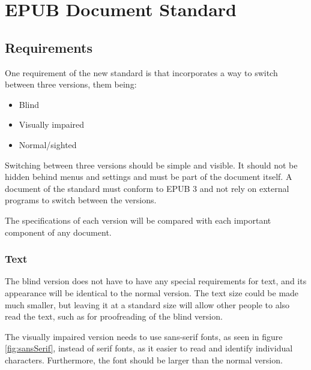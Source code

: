 \chapter{EPUB Document Standard}
\label{ch:EPUB Document Standard}

\section{Requirements}

One requirement of the new standard is that incorporates a way to switch between three versions, them being:

\begin{itemize}
	\item Blind
	\item Visually impaired
	\item Normal/sighted 
\end{itemize}

Switching between three versions should be simple and visible. It should not be hidden behind menus and settings and must be part of the document itself. A document of the standard must conform to EPUB 3 and not rely on external programs to switch between the versions.

The specifications of each version will be compared with each important component of any document.

\subsection{Text}

The blind version does not have to have any special requirements for text, and its appearance will be identical to the normal version. The text size could be made much smaller, but leaving it at a standard size will allow other people to also read the text, such as for proofreading of the blind version.

The visually impaired version needs to use sans-serif fonts, as seen in figure \ref{fig:sansSerif}, instead of serif fonts, as it easier to read and identify individual characters.\cite{pdfBarrierefrei} Furthermore, the font should be larger than the normal version. 

